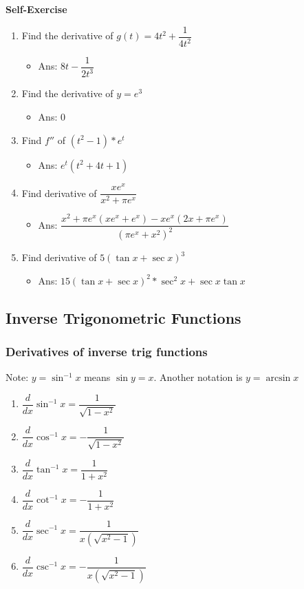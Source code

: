\documentclass[t]{beamer}
\theoremstyle{plain}
\theoremstyle{definition}
\newcounter{heading}
\newcommand{\makeheading}[1]{\medskip\begin{large}\noindent\textbf{{#1}}\end{large}\smallskip}
\begin{document}
\begin{frame}
\makeheading{Self-Exercise}

\begin{enumerate}

\item Find the derivative of $g(t) = 4t^2 + \dfrac{1}{4t^2}$ 
\begin{itemize}
	\item Ans: $8t - \dfrac{1}{2t^3}$
\end{itemize}

\item Find the derivative of $y = e^3$ 
\begin{itemize}
	\item Ans: $0$
\end{itemize}

\item Find $f''$ of $(t^2 -1)*e^t$ 
\begin{itemize}
	\item Ans: $e^t(t^2 + 4t+1)$
\end{itemize}

\item Find derivative of $\dfrac{xe^x}{x^2 + \pi e^x}$ 
\begin{itemize}
	\item Ans: $\dfrac{x^2 + \pi e^x(xe^x + e^x) - xe^x(2x + \pi e^x)}{(\pi e^x + x^2)^2}$
\end{itemize}

\item Find derivative of $5(\tan{x} + \sec{x})^3$ 
\begin{itemize}
	\item Ans: $15(\tan{x} + \sec{x})^2 * \sec^2{x} + \sec{x}\tan{x}$
\end{itemize}

\end{enumerate}

\end{frame}

\subsection{Inverse Trigonometric Functions}

\frame
{
\frametitle{Derivatives of inverse trig functions}

\footnotesize

Note: $y = \sin^{-1}{x}$  means $\sin y = x$.  Another notation is $y=\arcsin{x}$
\begin{enumerate}
\item $\dfrac{d}{dx}\sin^{-1}{x} = \dfrac{1}{\sqrt{1-x^2}}$
\item $\dfrac{d}{dx}\cos^{-1}{x} = -\dfrac{1}{\sqrt{1-x^2}}$
\item $\dfrac{d}{dx}\tan^{-1}{x} = \dfrac{1}{1+x^2}$
\item $\dfrac{d}{dx}\cot^{-1}{x} = -\dfrac{1}{1+x^2}$
\item $\dfrac{d}{dx}\sec^{-1}{x} = \dfrac{1}{x(\sqrt{x^2 - 1})}$
\item $\dfrac{d}{dx}\csc^{-1}{x} = -\dfrac{1}{x(\sqrt{x^2 - 1})}$
\end{enumerate}
}
\end{document}
